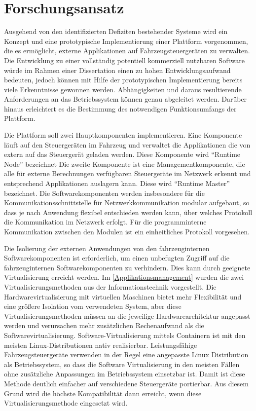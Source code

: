 \section{Forschungsansatz}
\label{Forschungsansatz}
Ausgehend von den identifizierten Defiziten bestehender Systeme wird ein Konzept und eine prototypische Implementierung einer Plattform vorgenommen, die es ermöglicht, externe Applikationen auf Fahrzeugsteuergeräten zu verwalten. Die Entwicklung zu einer vollständig potentiell kommerziell nutzbaren Software würde im Rahmen einer Dissertation einen zu hohen Entwicklungsaufwand bedeuten, jedoch können mit Hilfe der prototypischen Implementierung bereits viele Erkenntnisse gewonnen werden. Abhängigkeiten und daraus resultierende Anforderungen an das Betriebssystem können genau abgeleitet werden. Darüber hinaus erleichtert es die Bestimmung des notwendigen Funktionsumfangs der Plattform. 

Die Plattform soll zwei Hauptkomponenten implementieren. Eine Komponente läuft auf den Steuergeräten im Fahrzeug und verwaltet die Applikationen die von extern auf das Steuergerät geladen werden. Diese Komponente wird \enquote{Runtime Node} bezeichnet Die zweite Komponente ist eine Managementkomponente, die alle für externe Berechnungen verfügbaren Steuergeräte im Netzwerk erkennt und entsprechend Applikationen auslagern kann. Diese wird \enquote{Runtime Master} bezeichnet. Die Softwarekomponenten werden insbesondere für die Kommunikationsschnittstelle für Netzwerkkommunikation modular aufgebaut, so dass je nach Anwendung flexibel entschieden werden kann, über welches Protokoll die Kommunikation im Netzwerk erfolgt. Für die programminterne Kommunikation zwischen den Modulen ist ein einheitliches Protokoll vorgesehen. 

Die Isolierung der externen Anwendungen von den fahrzeuginternen Softwarekomponenten ist erforderlich, um einen unbefugten Zugriff auf die fahrzeuginternen Softwarekomponenten zu verhindern. Dies kann durch geeignete Virtualisierung erreicht werden. Im \autoref{Applikationsmanagement} wurden die zwei Virtualisierungsmethoden aus der Informationstechnik vorgestellt. Die Hardwarevirtualisierung mit virtuellen Maschinen bietet mehr Flexibilität und eine größere Isolation vom verwendeten System, aber diese Virtualisierungsmethoden müssen an die jeweilige Hardwarearchitektur angepasst werden und verursachen mehr zusätzlichen Rechenaufwand als die Softwarevirtualisierung. Software-Virtualisierung mittels Containern ist mit den meisten Linux-Distributionen nativ realisierbar. Leistungsfähige Fahrzeugsteuergeräte verwenden in der Regel eine angepasste Linux Distribution als Betriebssystem, so dass die Software Virtualisierung in den meisten Fällen ohne zusätzliche Anpassungen im Betriebssystem einsetzbar ist. Damit ist diese Methode deutlich einfacher auf verschiedene Steuergeräte portierbar. Aus diesem Grund wird die höchste Kompatibilität dann erreicht, wenn diese Virtualisierungsmethode eingesetzt wird. 

